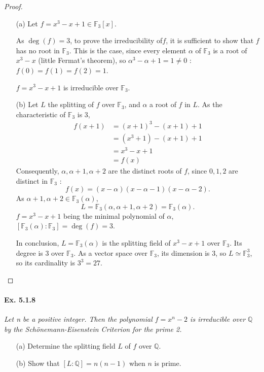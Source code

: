 \documentclass[11pt,a4paper]{article}
\newcommand{\Q}{\mathbb{Q}}
\newcommand{\F}{\mathbb{F}}
\begin{document}
\begin{proof}
\begin{enumerate}
\item[(a)]
Let $f = x^3-x+1 \in \F_3[x]$.

As $\deg(f) = 3$, to prove the irreducibility of$f$, it is sufficient to show that $f$ has no root in $\F_3$.
This is the case, since every element $\alpha$ of $\F_3$ is a root of $x^3-x$ (little Fermat's theorem), so $\alpha^3 - \alpha + 1 = 1 \ne 0$ : $f(0) = f(1)=f(2) = 1$.

$f = x^3-x+1$ is irreducible over $\F_3$.

\item[(b)]
Let $L$ the splitting  of $f$ over $\F_3$, and $\alpha$ a root of $f$ in $L$.
As the characteristic of $\F_3$ is 3,
\begin{align*}
f(x+1) &= (x+1)^3 -(x+1)+1\\
&= (x^3+1)-(x+1)+1\\
&= x^3-x+1\\
&=f(x)
\end{align*}
Consequently, $\alpha, \alpha+1,\alpha+2$ are the distinct roots of $f$, since $0,1,2$ are distinct in $\F_3$ : 
$$f(x) = (x-\alpha)(x-\alpha-1)(x-\alpha-2).$$
As $\alpha+1,\alpha+2 \in \F_3(\alpha)$, 
$$L = \F_3(\alpha,\alpha+1,\alpha+2) = \F_3(\alpha).$$
$f=x^3-x+1$ being the minimal polynomial of $\alpha$, $[\F_3(\alpha) : \F_3] = \deg(f) = 3$.

In conclusion, $L = \F_3(\alpha)$ is the splitting field of $x^3-x+1$ over $\F_3$. Its degree is 3 over $\F_3$. As a vector space over $\F_3$, its dimension is 3, so  $L \simeq \F_3^3$, so its cardinality is $3^3=27$.
\end{enumerate}
\end{proof}

\paragraph{Ex. 5.1.8}

{\it Let n be a positive integer. Then the polynomial $f = x^n-2$ is irreducible over $\Q$ by the Sch\"onemann-Eisenstein Criterion for the prime 2.
\begin{enumerate}
\item[(a)] Determine the splitting field $L$ of $f$ over $\Q$.
\item[(b)] Show that $[L:\Q] = n(n-1)$ when $n$ is prime.
\end{enumerate}
}
\end{document}
